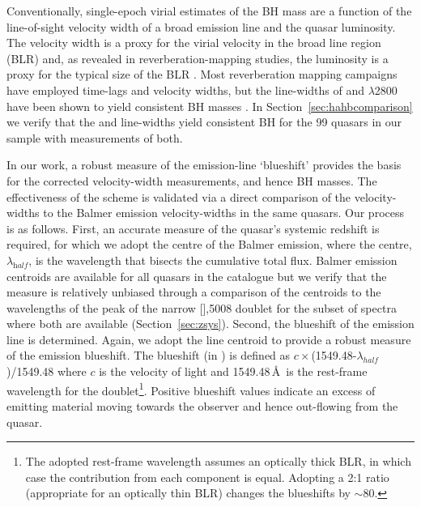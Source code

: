 Conventionally, single-epoch virial estimates of the BH mass are a function of the line-of-sight velocity width of a broad emission line and the quasar luminosity. 
The velocity width is a proxy for the virial velocity in the broad line region (BLR) and, as revealed in reverberation-mapping studies, the luminosity is a proxy for the typical size of the BLR \citep[the $R-L$ relation; e.g.][]{kaspi00,kaspi07}. 
Most reverberation mapping campaigns have employed \hb time-lags and velocity widths, but the line-widths of \ha and $\lambda$2800 have been shown to yield consistent BH masses \citep[e.g.][]{mclure02,greene05b,onken08,shen08,wang09,rafiee11,mejia-restrepo16}. 
In Section~\ref{sec:hahbcomparison} we verify that the \ha and \hb line-widths yield consistent BH for the 99 quasars in our sample with measurements of both.     

In our work, a robust measure of the  emission-line `blueshift' provides the basis for the corrected  velocity-width measurements, and hence BH masses.
The effectiveness of the scheme is validated via a direct comparison of the  velocity-widths to the Balmer emission velocity-widths in the same quasars. 
Our process is as follows. 
First, an accurate measure of the quasar's systemic redshift is required, for which we adopt the centre of the Balmer emission, where the centre, $\lambda_{\mathrm half}$, is the wavelength that bisects the cumulative total flux. 
Balmer emission centroids are available for all quasars in the catalogue but we verify that the measure is relatively unbiased through a comparison of the centroids to the wavelengths of the peak of the narrow [],5008 doublet for the subset of spectra where both are available (Section~\ref{sec:zsys}). 
Second, the blueshift of the  emission line is determined. 
Again, we adopt the line centroid to provide a robust measure of the  emission blueshift.
The blueshift (in \kms) is defined as $c\times$(1549.48-$\lambda_{half}$)/1549.48 where $c$ is the velocity of light and 1549.48\,\AA \ is the rest-frame wavelength for the  doublet\footnote{The adopted  rest-frame wavelength assumes an optically thick BLR, in which case the contribution from each component is equal. Adopting a 2:1 ratio (appropriate for an optically thin BLR) changes the blueshifts by $\sim$80\kms.}. 
Positive blueshift values indicate an excess of emitting material moving towards the observer and hence out-flowing from the quasar. 


